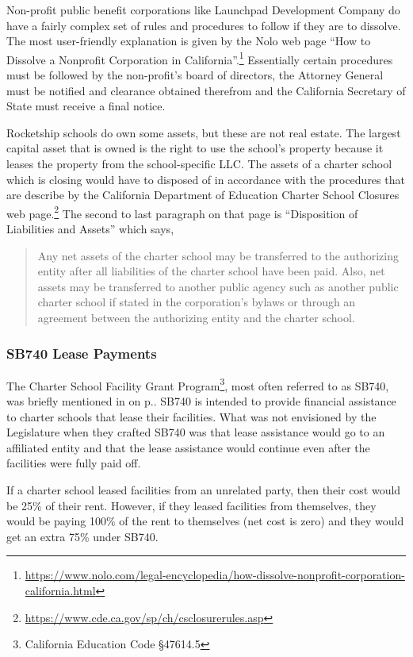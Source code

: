 Non-profit public benefit corporations like Launchpad Development Company do have a fairly complex set of rules and procedures to follow if they are to dissolve. The most user-friendly explanation is given by the Nolo web page ``How to Dissolve a Nonprofit Corporation in California''.\footnote{\url{https://www.nolo.com/legal-encyclopedia/how-dissolve-nonprofit-corporation-california.html}} Essentially certain procedures must be followed by the non-profit's board of directors, the Attorney General must be notified and clearance obtained therefrom and the California Secretary of State must receive a final notice.

Rocketship schools do own some assets, but these are not real estate. The largest capital asset that is owned is the right to use the school's property because it leases the property from the school-specific LLC. The assets of a charter school which is closing would have to disposed of in accordance with the procedures that are describe by the California Department of Education Charter School Closures web page.\footnote{\url{https://www.cde.ca.gov/sp/ch/csclosurerules.asp}} The second to last paragraph on that page is ``Disposition of Liabilities and Assets'' which says,
\blockquote[][]{Any net assets of the charter school may be transferred to the authorizing entity after all liabilities of the charter school have been paid. Also, net assets may be transferred to another public agency such as another public charter school if stated in the corporation's bylaws or through an agreement between the authorizing entity and the charter school.}

\subsubsection{SB740 Lease Payments}%
\label{sec:sb740-lease-payments}

The Charter School Facility Grant Program\footnote{California Education Code §47614.5}, most often referred to as SB740, was briefly mentioned in  on p.\pageref{sec:rent-subsidies}. SB740 is intended to provide financial assistance to charter schools that lease their facilities. What was not envisioned by the Legislature when they crafted SB740 was that lease assistance would go to an affiliated entity and that the lease assistance would continue even after the facilities were fully paid off.

If a charter school leased facilities from an unrelated party, then their cost would be 25\% of their rent. However, if they leased facilities from themselves, they would be paying 100\% of the rent to themselves (net cost is zero) and they would get an extra 75\% under SB740.

